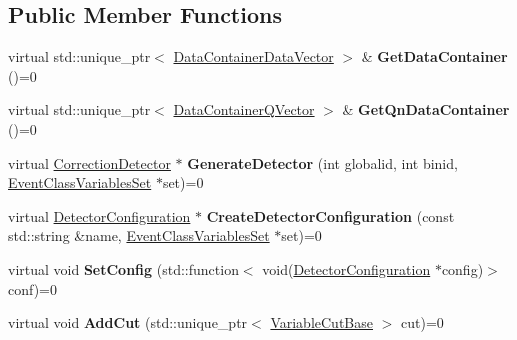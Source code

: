 \subsection*{Public Member Functions}
\begin{DoxyCompactItemize}
\item 
\mbox{\label{classQn_1_1DetectorBase_a5123507d64cd89af08f8f5ed56dffc22}} 
virtual std\+::unique\+\_\+ptr$<$ \mbox{\hyperlink{classQn_1_1DataContainer}{Data\+Container\+Data\+Vector}} $>$ \& {\bfseries Get\+Data\+Container} ()=0
\item 
\mbox{\label{classQn_1_1DetectorBase_a92928192623525ba5b74b1082c9b482c}} 
virtual std\+::unique\+\_\+ptr$<$ \mbox{\hyperlink{classQn_1_1DataContainer}{Data\+Container\+Q\+Vector}} $>$ \& {\bfseries Get\+Qn\+Data\+Container} ()=0
\item 
\mbox{\label{classQn_1_1DetectorBase_acfc970cde94b5d09a3d1316fb3d6e36f}} 
virtual \mbox{\hyperlink{classQn_1_1CorrectionDetector}{Correction\+Detector}} $\ast$ {\bfseries Generate\+Detector} (int globalid, int binid, \mbox{\hyperlink{classQn_1_1EventClassVariablesSet}{Event\+Class\+Variables\+Set}} $\ast$set)=0
\item 
\mbox{\label{classQn_1_1DetectorBase_a720efe2f7086b4c7f68edf95d214a93a}} 
virtual \mbox{\hyperlink{classQn_1_1DetectorConfiguration}{Detector\+Configuration}} $\ast$ {\bfseries Create\+Detector\+Configuration} (const std\+::string \&name, \mbox{\hyperlink{classQn_1_1EventClassVariablesSet}{Event\+Class\+Variables\+Set}} $\ast$set)=0
\item 
\mbox{\label{classQn_1_1DetectorBase_a83e9646091bccacffa297f0b23f5cb09}} 
virtual void {\bfseries Set\+Config} (std\+::function$<$ void(\mbox{\hyperlink{classQn_1_1DetectorConfiguration}{Detector\+Configuration}} $\ast$config)$>$ conf)=0
\item 
\mbox{\label{classQn_1_1DetectorBase_a95630775362a14958ef270dc115c5679}} 
virtual void {\bfseries Add\+Cut} (std\+::unique\+\_\+ptr$<$ \mbox{\hyperlink{structQn_1_1VariableCutBase}{Variable\+Cut\+Base}} $>$ cut)=0
\item 
\mbox{\label{classQn_1_1DetectorBase_a1d85af0a10390f65223cae91b7ef2883}} 

\end{DoxyCompactItemize}
